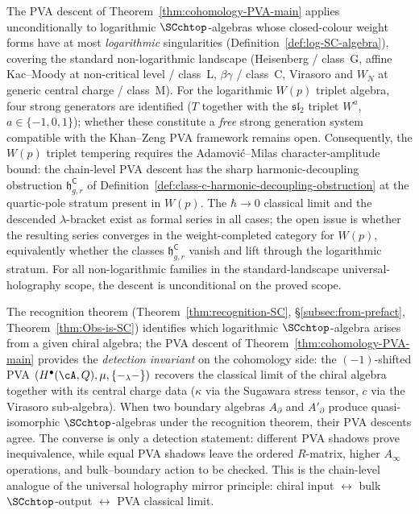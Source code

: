\begin{remark}
\label{rem:pva-wp-tempering-scope}
The PVA descent of Theorem~\ref{thm:cohomology-PVA-main} applies
unconditionally to logarithmic $\SCchtop$-algebras whose closed-colour
weight forms have at most \emph{logarithmic} singularities
(Definition~\ref{def:log-SC-algebra}), covering the standard
non-logarithmic landscape (Heisenberg / class~G, affine Kac--Moody at
non-critical level / class~L, $\beta\gamma$ / class~C, Virasoro and
$W_N$ at generic central charge / class~M). For the logarithmic
$W(p)$ triplet algebra, four strong generators are identified ($T$
together with the $\mathfrak{sl}_2$ triplet $W^a$,
$a \in \{-1, 0, 1\}$); whether these constitute a \emph{free} strong
generation system compatible with the Khan--Zeng PVA framework
\cite{KZ25} remains open. Consequently, the $W(p)$ triplet tempering
requires the Adamovi\'c--Milas character-amplitude bound: the
chain-level PVA descent has the sharp harmonic-decoupling obstruction
\(\mathfrak h_{g,r}^{\mathsf C}\)
of Definition~\ref{def:class-c-harmonic-decoupling-obstruction} at the
quartic-pole stratum present in $W(p)$. The $\hbar \to 0$
classical limit and the
descended $\lambda$-bracket exist as formal series in all cases; the
open issue is whether the resulting series converges in the
weight-completed category for $W(p)$, equivalently whether the
classes \(\mathfrak h_{g,r}^{\mathsf C}\) vanish and lift through the
logarithmic stratum. For all
non-logarithmic families in the standard-landscape universal-holography
scope, the descent is unconditional on the proved scope.
\end{remark}

\begin{remark}
\label{rem:pva-recognition-detection}
The recognition theorem (Theorem~\ref{thm:recognition-SC}, \S\ref{subsec:from-prefact},
Theorem~\ref{thm:Obs-is-SC}) identifies which logarithmic $\SCchtop$-algebra
arises from a given chiral algebra; the PVA descent of
Theorem~\ref{thm:cohomology-PVA-main} provides the \emph{detection invariant}
on the cohomology side: the $(-1)$-shifted PVA $(H^\bullet(\cA,Q), \mu, \{-_\lambda-\})$
recovers the classical limit of the chiral algebra together with its central
charge data ($\kappa$ via the Sugawara stress tensor, $c$ via the Virasoro
sub-algebra). When two boundary algebras $A_\partial$ and $A'_\partial$ produce
quasi-isomorphic $\SCchtop$-algebras under the recognition theorem, their
PVA descents agree. The converse is only a detection statement:
different PVA shadows prove inequivalence, while equal PVA shadows
leave the ordered $R$-matrix, higher $A_\infty$ operations, and
bulk--boundary action to be checked. This is the chain-level analogue of the universal
holography mirror principle: chiral input $\leftrightarrow$ bulk
$\SCchtop$-output $\leftrightarrow$ PVA classical limit.
\end{remark}

